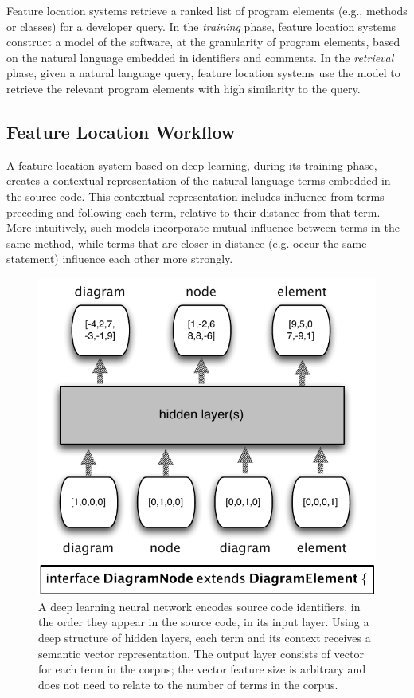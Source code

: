 
%
%

%
Feature location systems retrieve a ranked list of program elements (e.g.,
methods or classes) for a developer query. In the {\em training} phase, feature
location systems construct a model of the software, at the granularity
of program elements, based on the natural language embedded in identifiers and
comments. In the {\em retrieval} phase, given a natural language query, feature
location systems use the model to retrieve the relevant program elements
with high similarity to the query.

\subsection{Feature Location Workflow}

%
A feature location system based on deep learning, during its training phase,
creates a contextual representation of the natural language terms embedded in
the source code. This contextual representation includes influence from terms
preceding and following each term, relative to their distance from that term.
More intuitively, such models incorporate mutual influence between terms in the
same method, while terms that are closer in distance (e.g. occur the same
statement) influence each other more strongly.


\begin{figure}[tb]
\centering
\includegraphics[width=.9\columnwidth]{figures/neuralnet.pdf}
\caption{A deep learning neural network encodes source code identifiers, in the
order they appear in the source code, in its input layer. Using a deep
structure of hidden layers, each term and its context receives a semantic
vector representation. The output layer consists of vector for each term in
the corpus; the vector feature size is arbitrary and does not need to relate to
the number of terms in the corpus.
\vspace*{-2mm}
}
\label{fig:neuralnet}
\end{figure}


